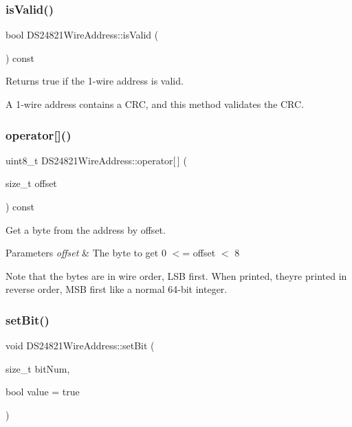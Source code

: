 \subsubsection{\texorpdfstring{is\+Valid()}{isValid()}}
{\footnotesize\ttfamily bool D\+S24821\+Wire\+Address\+::is\+Valid (\begin{DoxyParamCaption}{ }\end{DoxyParamCaption}) const}



Returns true if the 1-\/wire address is valid. 

A 1-\/wire address contains a C\+RC, and this method validates the C\+RC. \mbox{\label{class_d_s24821_wire_address_a67beb121b96c0f236a57f144b6a8a183}} 
\subsubsection{\texorpdfstring{operator[]()}{operator[]()}}
{\footnotesize\ttfamily uint8\+\_\+t D\+S24821\+Wire\+Address\+::operator\mbox{[}$\,$\mbox{]} (\begin{DoxyParamCaption}\item[{size\+\_\+t}]{offset }\end{DoxyParamCaption}) const\hspace{0.3cm}{\ttfamily [inline]}}



Get a byte from the address by offset. 


\begin{DoxyParams}{Parameters}
{\em offset} & The byte to get 0 $<$= offset $<$ 8\\
\hline
\end{DoxyParams}
Note that the bytes are in wire order, L\+SB first. When printed, they\textquotesingle{}re printed in reverse order, M\+SB first like a normal 64-\/bit integer. \mbox{\label{class_d_s24821_wire_address_a04139e9c1fb6a2e001c3e1ab1db99cf4}} 
\subsubsection{\texorpdfstring{set\+Bit()}{setBit()}}
{\footnotesize\ttfamily void D\+S24821\+Wire\+Address\+::set\+Bit (\begin{DoxyParamCaption}\item[{size\+\_\+t}]{bit\+Num,  }\item[{bool}]{value = {\ttfamily true} }\end{DoxyParamCaption})}



